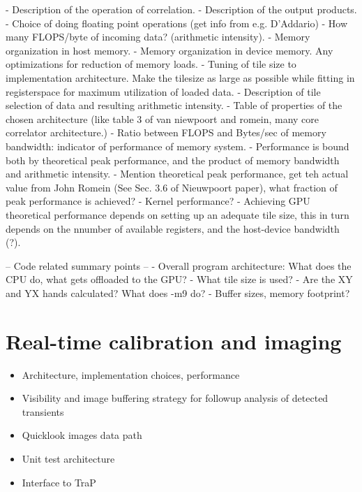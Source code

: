 \documentclass{aa}
\begin{document}
- Description of the operation of correlation.
- Description of the output products.
- Choice of doing floating point operations (get info from e.g. D'Addario)
- How many FLOPS/byte of incoming data? (arithmetic intensity).
- Memory organization in host memory.
- Memory organization in device memory. Any optimizations for reduction of memory loads.
- Tuning of tile size to implementation architecture. Make the tilesize as large as possible while fitting in registerspace for maximum utilization of loaded data.
- Description of tile selection of data and resulting arithmetic intensity.
- Table of properties of the chosen architecture (like table 3 of van niewpoort and romein, many core correlator architecture.)
- Ratio between FLOPS and Bytes/sec of memory bandwidth: indicator of performance of memory system.
- Performance is bound both by theoretical peak performance, and the product of memory bandwidth and arithmetic intensity.
- Mention theoretical peak performance, get teh actual value from John Romein (See Sec. 3.6 of Nieuwpoort paper), what fraction of peak performance is achieved?
- Kernel performance?
- Achieving GPU theoretical performance depends on setting up an adequate tile size, this in turn depends on the nnumber of available registers, and the host-device bandwidth (?).

-- Code related summary points --
- Overall program architecture: What does the CPU do, what gets offloaded to the GPU?
- What tile size is used?
- Are the XY and YX hands calculated? What does -m9 do?
- Buffer sizes, memory footprint?


\section {\label{sec:calim} Real-time calibration and imaging}
\begin {itemize}
 \item {Architecture, implementation choices, performance}
 \item  {Visibility  and  image  buffering strategy  for  followup  analysis  of
   detected transients}
 \item {Quicklook images data path}
 \item {Unit test architecture}
 \item {Interface to TraP}
\end {itemize}
\end{document}
